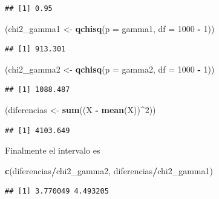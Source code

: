 \documentclass[
  12pt,
]{book}
\newenvironment{Shaded}{\begin{snugshade}}{\end{snugshade}}
\newcommand{\DataTypeTok}[1]{\textcolor[rgb]{0.13,0.29,0.53}{#1}}
\newcommand{\DecValTok}[1]{\textcolor[rgb]{0.00,0.00,0.81}{#1}}
\newcommand{\KeywordTok}[1]{\textcolor[rgb]{0.13,0.29,0.53}{\textbf{#1}}}
\newcommand{\NormalTok}[1]{#1}
\newcommand{\OperatorTok}[1]{\textcolor[rgb]{0.81,0.36,0.00}{\textbf{#1}}}
\newcommand{\StringTok}[1]{\textcolor[rgb]{0.31,0.60,0.02}{#1}}
\begin{document}
\begin{verbatim}
## [1] 0.95
\end{verbatim}

\begin{Shaded}
\begin{Highlighting}[]
\NormalTok{(chi2\_gamma1 \textless{}{-}}\StringTok{ }\KeywordTok{qchisq}\NormalTok{(}\DataTypeTok{p =}\NormalTok{ gamma1, }\DataTypeTok{df =} \DecValTok{1000} \OperatorTok{{-}}\StringTok{ }\DecValTok{1}\NormalTok{))}
\end{Highlighting}
\end{Shaded}

\begin{verbatim}
## [1] 913.301
\end{verbatim}

\begin{Shaded}
\begin{Highlighting}[]
\NormalTok{(chi2\_gamma2 \textless{}{-}}\StringTok{ }\KeywordTok{qchisq}\NormalTok{(}\DataTypeTok{p =}\NormalTok{ gamma2, }\DataTypeTok{df =} \DecValTok{1000} \OperatorTok{{-}}\StringTok{ }\DecValTok{1}\NormalTok{))}
\end{Highlighting}
\end{Shaded}

\begin{verbatim}
## [1] 1088.487
\end{verbatim}

\begin{Shaded}
\begin{Highlighting}[]
\NormalTok{(diferencias \textless{}{-}}\StringTok{ }\KeywordTok{sum}\NormalTok{((X }\OperatorTok{{-}}\StringTok{ }\KeywordTok{mean}\NormalTok{(X))}\OperatorTok{\^{}}\DecValTok{2}\NormalTok{))}
\end{Highlighting}
\end{Shaded}

\begin{verbatim}
## [1] 4103.649
\end{verbatim}

Finalmente el intervalo es

\begin{Shaded}
\begin{Highlighting}[]
\KeywordTok{c}\NormalTok{(diferencias}\OperatorTok{/}\NormalTok{chi2\_gamma2, diferencias}\OperatorTok{/}\NormalTok{chi2\_gamma1)}
\end{Highlighting}
\end{Shaded}

\begin{verbatim}
## [1] 3.770049 4.493205
\end{verbatim}
\end{document}

